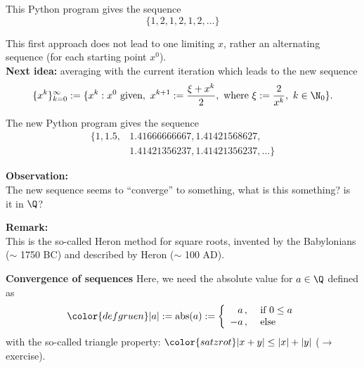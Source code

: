 {\begin{frame} 
\begin{minipage}[c]{0.5\textwidth}
%	
\end{minipage}
\begin{minipage}[c]{0.5\textwidth}
This Python program gives the sequence
\[
\{1,2,1,2,1,2,\ldots\}
\]
\end{minipage}
This first approach does not lead to one limiting $x$, rather an alternating sequence (for each starting point $x^0$).\\[10pt]
\textbf{Next idea:} averaging with the current iteration which leads to the new sequence
\[
\{x^k\}_{k=0}^\infty:=\{x^k: x^0 \text{ given},~ x^{k+1}:=\frac{\xi+x^{k}}{2}, \text{ where }  \xi:=\frac{2}{x^{k}},~ k\in\N_0\}.
\]
\begin{minipage}[c]{0.5\textwidth}
%	
\end{minipage}
\begin{minipage}[c]{0.5\textwidth}
The new Python program gives the sequence
\begin{align*}
\{1,1.5,
&1.41666666667,1.41421568627,\\
&1.41421356237,
1.41421356237,
\ldots\}
\end{align*}
\end{minipage}

\vspace{0.15cm}
\textbf{Observation:}\\ The new sequence seems to ``converge'' to something, what is this something? is it in $\Q$? 

\textbf{Remark:}\\This is the so-called {\sc Heron} method for square roots, invented by the Babylonians ($\sim$ 1750 BC) and described by Heron ($\sim$ 100 AD).
\end{frame}


\begin{frame} 
\textbf{Convergence of sequences}
\vspace{-0.4cm}
Here, we need the absolute value for $a\in\Q$ defined as 
$$ \color{defgruen}
|a|:=\text{abs}(a):=\left\{
\begin{array}{rl}
a\, ,&\text{ if }0\le a\\
-a\, ,&\text{ else}
\end{array}
\right.
$$
with the so-called triangle property: $\color{satzrot}|x+y|\le|x|+|y|$ ($\rightarrow$ exercise).


\end{frame}}

